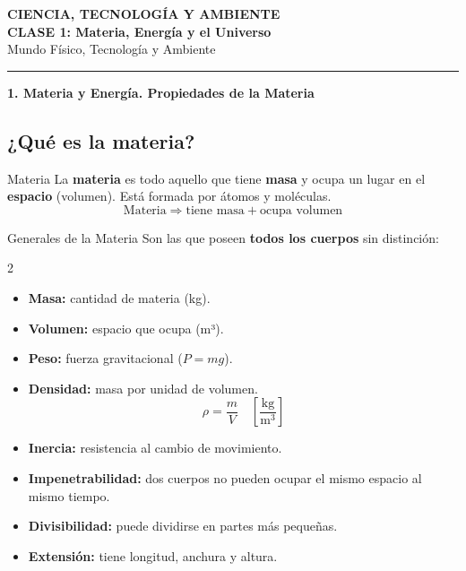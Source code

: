 \documentclass[11pt]{article}
\newcommand{\seccion}[2]{%
	\begin{tcolorbox}[colback=#1, colframe=#1, arc=4pt,
		left=8pt, right=8pt, top=4pt, bottom=4pt,
		before skip=12pt, after skip=6pt]
		\textbf{\large\color{white} #2}
	\end{tcolorbox}%
}
\begin{document}
	\begin{center}
		{\Large\bfseries\color{azulprim} CIENCIA, TECNOLOG\'IA Y AMBIENTE}\\[4pt]
		{\large\bfseries CLASE 1: Materia, Energ\'ia y el Universo}\\[4pt]
		{\normalsize\color{verdeprim} Mundo F\'isico, Tecnolog\'ia y Ambiente}\\[2pt]
		\textcolor{azulprim}{\rule{\linewidth}{1.5pt}}
	\end{center}
	\seccion{azulprim}{1. Materia y Energ\'ia. Propiedades de la Materia}
	\subsection{¿Qué es la materia?}
	\begin{defbox}{Materia}
		La \textbf{materia} es todo aquello que tiene \textbf{masa} y ocupa un lugar en el \textbf{espacio} (volumen). Est\'a formada por \'atomos y mol\'eculas.
		\[
		\text{Materia} \Rightarrow \text{tiene masa} + \text{ocupa volumen}
		\]
	\end{defbox}
	\begin{propbox}{Generales de la Materia}
		Son las que poseen \textbf{todos los cuerpos} sin distinci\'on:
		\begin{multicols}{2}
			\begin{itemize}[itemsep=3pt]
				\item \textbf{Masa:} cantidad de materia (kg).
				\item \textbf{Volumen:} espacio que ocupa (m³).
				\item \textbf{Peso:} fuerza gravitacional ($P = mg$).
				\item \textbf{Densidad:} masa por unidad de volumen.
				\[
				\rho = \frac{m}{V} \quad \left[\frac{\mathrm{kg}}{\mathrm{m}^3}\right]
				\]
				\item \textbf{Inercia:} resistencia al cambio de movimiento.
				\item \textbf{Impenetrabilidad:} dos cuerpos no pueden ocupar el mismo espacio al mismo tiempo.
				\item \textbf{Divisibilidad:} puede dividirse en partes m\'as peque\~nas.
				\item \textbf{Extensi\'on:} tiene longitud, anchura y altura.
			\end{itemize}
		\end{multicols}
	\end{propbox}
\end{document}

